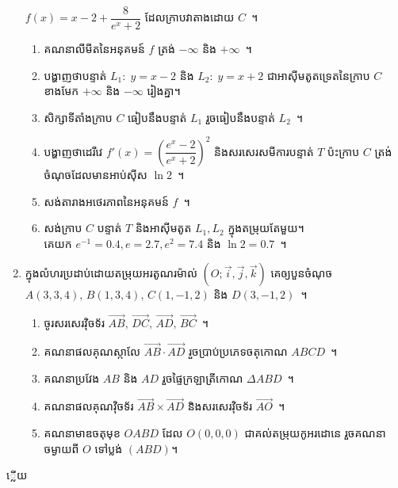 \documentclass[11pt,a4paper]{myclass}
\begin{document}
\begin{enumerate}
		$ f(x)=x-2+\dfrac{8}{e^x+2} $ ដែលក្រាបវាតាងដោយ $ C $~។
		\begin{enumerate}
			\item គណនាលីមីតនៃអនុគមន៍ $ f $ ត្រង់ $ -\infty $ និង $ +\infty $~។
			\item បង្ហាញថាបន្ទាត់ $ L_1:\;y=x-2 $ និង $ L_2:\;y=x+2 $ ជាអាស៊ីមតូតទ្រេតនៃក្រាប $ C $ ខាងមែក $ +\infty $ និង $ -\infty $ រៀងគ្នា។
			\item សិក្សាទីតាំងក្រាប $ C $ ធៀបនឹងបន្ទាត់ $ L_1 $ រួចធៀបនឹងបន្ទាត់ $ L_2 $~។
			\item បង្ហាញថាដេរីវេ $ f'(x)=\left(\dfrac{e^x-2}{e^x+2}\right)^2 $ និងសរសេរសមីការបន្ទាត់ $ T $ ប៉ះក្រាប $ C $ ត្រង់ចំណុចដែលមានអាប់ស៊ីស $ \ln 2 $~។
			\item សង់តារាងអថេរភាពនៃអនុគមន៍ $ f $~។
			\item សង់ក្រាប $ C $ បន្ទាត់ $ T $ និងអាស៊ីមតូត $ L_1,L_2 $ ក្នុងតម្រុយតែមួយ។\\
			គេយក $ e^{-1}=0.4,e=2.7,e^2=7.4 $ និង $ \ln 2=0.7 $~។
		\end{enumerate}
		\item ក្នុងលំហរប្រដាប់ដោយតម្រុយអរតូណរម៉ាល់ $ (O;\vec{i},\vec{j},\vec{k}) $ គេឲ្យបួនចំណុច $ A(3,3,4),\,B(1,3,4),\,C(1,-1,2) $ និង $ D(3,-1,2) $~។%
		\begin{enumerate}
			\item ចូរសរសេរវ៉ិចទ័រ $ \overrightarrow{AB},\,\overrightarrow{DC},\,\overrightarrow{AD},\,\overrightarrow{BC} $~។
			\item គណនាផលគុណស្កាលែ $ \overrightarrow{AB}\cdot\overrightarrow{AD} $ រួចប្រាប់ប្រភេទចតុកោណ $ ABCD $~។
			\item គណនាប្រវែង $ AB $ និង $ AD $ រួចផ្ទៃក្រឡាត្រីកោណ $ \Delta ABD $~។
			\item គណនាផលគុណវ៉ិចទ័រ $ \overrightarrow{AB}\times \overrightarrow{AD} $ និងសរសេរវ៉ិចទ័រ $ \overrightarrow{AO} $~។
			\item គណនាមាឌចតុមុខ $ OABD $ ដែល $ O(0,0,0) $ ជាគល់តម្រុយកូអរដោនេ រួចគណនាចម្ងាយពី $ O $ ទៅប្លង់ $ (ABD) $។
		\end{enumerate}
	\end{enumerate}
	\newpage
	\centerline{\expandafter{}្លើយ}
\end{document}
